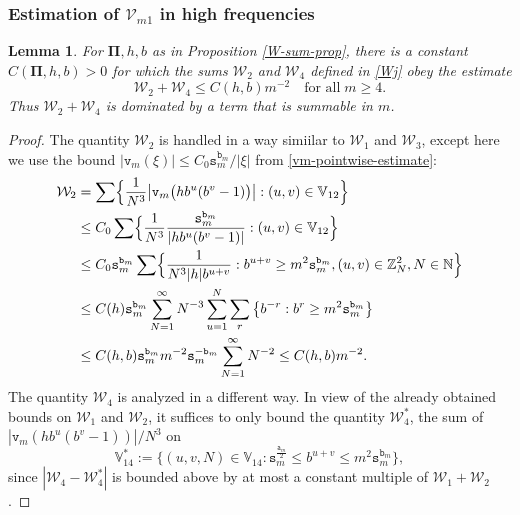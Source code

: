 \documentclass[12pt, twoside]{article}
\newtheorem{lemma}[theorem]{Lemma}
\theoremstyle{definition}
\numberwithin{equation}{section}
\begin{document}
\subsubsection{Estimation of $\mathcal{V}_{m1}$ in high frequencies} 
\begin{lemma} 
For $\pmb{\Pi}, h, b$ as in Proposition \ref{W-sum-prop}, there is a constant $C(\pmb{\Pi}, h, b) > 0$ for which the sums $\mathcal W_2$ and $\mathcal W_4$ defined in \eqref{Wj} obey the estimate
\begin{equation} 
\mathcal W_2 + \mathcal W_4 \leq C(h, b) m^{-2} \quad \text{for all}\;m \geq 4. \label{W2W4-bound}
\end{equation} 
Thus $\mathcal W_2 + \mathcal W_4$ is dominated by a term that is summable in $m$. 
\end{lemma} 
\begin{proof} 
The quantity $\mathcal W_2$ is handled in a way simiilar to $\mathcal W_1$ and $\mathcal W_3$, except here we use the bound $|\mathtt v_m(\xi)| \leq C_0 \mathtt s_m^{\mathtt b_m}/|\xi|$ from \eqref{vm-pointwise-estimate}:  
\begin{align} 
\mathcal W_2 &= \sum \Bigl\{ \frac{1}{N^3}\bigl| \mathtt v_m \bigl(hb^u(b^v-1) \bigr) \bigr| : (u, v) \in \mathbb V_{12} \Bigr\} \nonumber  \\ 
&\leq C_0  \sum \Bigl\{ \frac{1}{N^{3}} \frac{\mathtt s_m^{\mathtt b_m}}{|h b^u(b^v-1)|}  : (u, v) \in \mathbb V_{12} \Bigr\} \nonumber \\
&\leq C_0 \mathtt s_m^{\mathtt b_m}  \sum \Bigl\{ \frac{1}{N^{3} |h| b^{u+v}} : b^{u+v} \geq m^2 \mathtt s_m^{{\mathtt b_m}}, (u, v) \in \mathbb Z_N^2, N\in\mathbb{N} \Bigr\} \nonumber \\ 
&\leq C(h) \mathtt s_m^{\mathtt b_m} \sum_{N=1}^{\infty} N^{-3} \sum_{u=1}^{N} \sum_r \left\{b^{-r} : b^r \geq m^2 \mathtt s_m^{\mathtt b_m} \right\} \nonumber \\ 
&\leq C(h, b) \mathtt s_m^{\mathtt b_m} m^{-2} \mathtt s_m^{-\mathtt b_m} \sum_{N=1}^{\infty} N^{-2} \leq C(h, b) m^{-2}. \label{W2} 
\end{align}
The quantity $\mathcal W_4$ is analyzed in a different way. In view of the already obtained bounds on $\mathcal W_1$ and $\mathcal W_2$,  it suffices to only bound the quantity $\mathcal W_4^{\ast}$, the sum of $|\mathtt v_m(h b^u (b^v-1))|/N^3$ on
\[ \mathbb V_{14}^{\ast} := \bigl\{(u, v, N) \in \mathbb V_{14} : \mathtt s_m^{\frac{\mathtt a_m}{2}} \leq b^{u+v} \leq m^2 \mathtt s_m^{\mathtt b_m}\bigr\}, \]
since $|\mathcal W_4 - \mathcal W_4^{\ast}|$ is bounded above by at most a constant multiple of $\mathcal W_1 + \mathcal W_2$. 

\end{proof}
\end{document}
